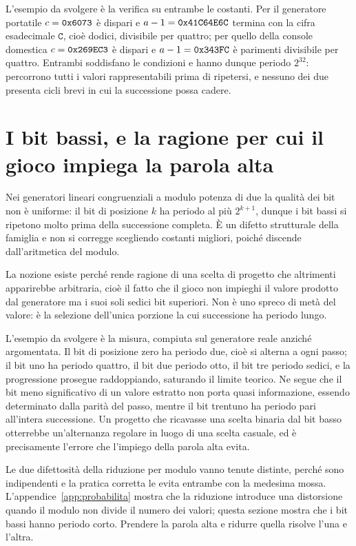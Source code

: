 L'esempio da svolgere è la verifica su entrambe le costanti. Per il generatore portatile $c = \texttt{0x6073}$ è dispari e $a - 1 = \texttt{0x41C64E6C}$ termina con la cifra esadecimale $\mathtt{C}$, cioè dodici, divisibile per quattro; per quello della console domestica $c = \texttt{0x269EC3}$ è dispari e $a - 1 = \texttt{0x343FC}$ è parimenti divisibile per quattro. Entrambi soddisfano le condizioni e hanno dunque periodo $2^{32}$: percorrono tutti i valori rappresentabili prima di ripetersi, e nessuno dei due presenta cicli brevi in cui la successione possa cadere.

\section{I bit bassi, e la ragione per cui il gioco impiega la parola alta}

Nei generatori lineari congruenziali a modulo potenza di due la qualità dei bit non è uniforme: il bit di posizione $k$ ha periodo al più $2^{k+1}$, dunque i bit bassi si ripetono molto prima della successione completa. È un difetto strutturale della famiglia e non si corregge scegliendo costanti migliori, poiché discende dall'aritmetica del modulo.

La nozione esiste perché rende ragione di una scelta di progetto che altrimenti apparirebbe arbitraria, cioè il fatto che il gioco non impieghi il valore prodotto dal generatore ma i suoi soli sedici bit superiori. Non è uno spreco di metà del valore: è la selezione dell'unica porzione la cui successione ha periodo lungo.

L'esempio da svolgere è la misura, compiuta sul generatore reale anziché argomentata. Il bit di posizione zero ha periodo due, cioè si alterna a ogni passo; il bit uno ha periodo quattro, il bit due periodo otto, il bit tre periodo sedici, e la progressione prosegue raddoppiando, saturando il limite teorico. Ne segue che il bit meno significativo di un valore estratto non porta quasi informazione, essendo determinato dalla parità del passo, mentre il bit trentuno ha periodo pari all'intera successione. Un progetto che ricavasse una scelta binaria dal bit basso otterrebbe un'alternanza regolare in luogo di una scelta casuale, ed è precisamente l'errore che l'impiego della parola alta evita.

Le due difettosità della riduzione per modulo vanno tenute distinte, perché sono indipendenti e la pratica corretta le evita entrambe con la medesima mossa. L'appendice~\ref{app:probabilita} mostra che la riduzione introduce una distorsione quando il modulo non divide il numero dei valori; questa sezione mostra che i bit bassi hanno periodo corto. Prendere la parola alta e ridurre quella risolve l'una e l'altra.

